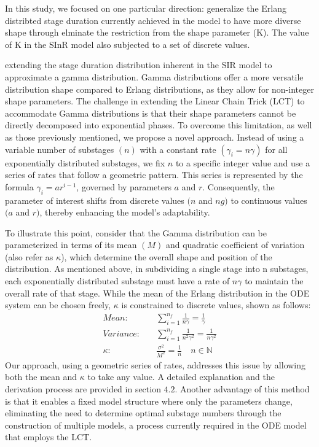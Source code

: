 \documentclass[12pt]{article}
\begin{document}
In this study, we focused on one particular direction: generalize the Erlang distribted stage duration currently achieved in the model to have more diverse shape through elminate the restriction from the shape parameter (K). The value of K in the SInR model also subjected to a set of discrete values.

extending the stage duration distribution inherent in the SIR model to approximate a gamma distribution. Gamma distributions offer a more versatile distribution shape compared to Erlang distributions, as they allow for non-integer shape parameters. The challenge in extending the Linear Chain Trick (LCT) to accommodate Gamma distributions is that their shape parameters cannot be directly decomposed into exponential phases. To overcome this limitation, as well as those previously mentioned, we propose a novel approach. Instead of using a variable number of substages $(n)$ with a constant rate $(\gamma_i = n\gamma)$ for all exponentially distributed substages, we fix $n$ to a specific integer value and use a series of rates that follow a geometric pattern. This series is represented by the formula $\gamma_i = ar^{i-1}$, governed by parameters $a$ and $r$. Consequently, the parameter of interest shifts from discrete values $(n$ and $ng)$ to continuous values $(a$ and $r)$, thereby enhancing the model's adaptability.

To illustrate this point, consider that the Gamma distribution can be parameterized in terms of its mean $(M)$ and quadratic coefficient of variation (also refer as $\kappa$), which determine the overall shape and position of the distribution. As mentioned above, in subdividing a single stage into n substages, each exponentially distributed substage must have a rate of $n\gamma$ to maintain the overall rate of that stage. While the mean of the Erlang distribution in the ODE system can be chosen freely, $\kappa$ is constrained to discrete values, shown as follows:
\begin{align*}
    Mean: \quad &\sum_{i=1}^{n_f} \frac{1}{n\gamma} = \frac{1}{\gamma}\\
    Variance: \quad &\sum_{i=1}^{n_f} \frac{1}{n^2\gamma^2} = \frac{1}{n\gamma^2} \\
    \kappa: \quad &\frac{\sigma^2}{M^2} = \frac{1}{n} \quad n \in \mathbb{N}
\end{align*}
Our approach, using a geometric series of rates, addresses this issue by allowing both the mean and $\kappa$ to take any value. A detailed explanation and the derivation process are provided in section $4.2$. Another advantage of this method is that it enables a fixed model structure where only the parameters change, eliminating the need to determine optimal substage numbers through the construction of multiple models, a process currently required in the ODE model that employs the LCT.
\end{document}
